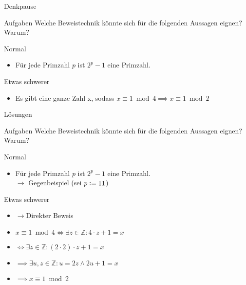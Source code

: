\documentclass[10pt]{beamer}
\begin{document}
{
\begin{frame}[fragile]{Denkpause}
    \begin{alertblock}{Aufgaben}
    Welche Beweistechnik könnte sich für die folgenden Aussagen eignen? Warum?
    \end{alertblock}
    
    \begin{block}{Normal}
        \begin{itemize}
            \item Für jede Primzahl $p$ ist $2^p-1$ eine Primzahl.
        \end{itemize}
    \end{block}
    \begin{block}{Etwas schwerer}
    \begin{itemize}
            \item Es gibt eine ganze Zahl x, sodass $x\equiv 1\bmod 4 \implies x\equiv 1\bmod 2$ 
    \end{itemize}
        
    \end{block}
\end{frame}
}

{
\begin{frame}[fragile]{Lösungen}
    \begin{alertblock}{Aufgaben}
    Welche Beweistechnik könnte sich für die folgenden Aussagen eignen? Warum?
    \end{alertblock}
    
    \begin{block}{Normal}
        \begin{itemize}
            \item Für jede Primzahl $p$ ist $2^p-1$ eine Primzahl.\\
            $\rightarrow$ Gegenbeispiel (sei $p\vcentcolon=11$)
        \end{itemize}
    \end{block}
    \begin{block}{Etwas schwerer}
        \begin{itemize}
            \item[] $\rightarrow$Direkter Beweis
            \item $x\equiv 1\bmod 4\iff\exists z\in\mathbb{Z} : 4 \cdot z + 1 = x$
            \item $\iff\exists z\in\mathbb{Z}: (2 \cdot 2) \cdot z + 1 = x$
            \item $\implies\exists u,z\in\mathbb{Z}: u = 2z\wedge 2u + 1 = x$
            \item $\implies x\equiv 1\bmod 2$
        \end{itemize}
    \end{block}
\end{frame}
}
\end{document}

